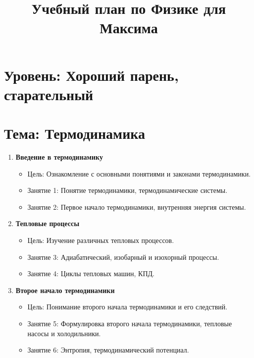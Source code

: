 \documentclass{article}
\begin{document}
\title{\textbf{Учебный план по Физике для Максима}}
\author{}
\date{}
\maketitle

\section*{Уровень: Хороший парень, старательный}

\section*{Тема: Термодинамика}

\begin{enumerate}[label=\textbf{\arabic*.}, leftmargin=*]
  \item \textbf{Введение в термодинамику}
    \begin{itemize}
        \item Цель: Ознакомление с основными понятиями и законами термодинамики.
        \item Занятие 1: Понятие термодинамики, термодинамические системы.
        \item Занятие 2: Первое начало термодинамики, внутренняя энергия системы.
    \end{itemize}
  
  \item \textbf{Тепловые процессы}
    \begin{itemize}
        \item Цель: Изучение различных тепловых процессов.
        \item Занятие 3: Адиабатический, изобарный и изохорный процессы.
        \item Занятие 4: Циклы тепловых машин, КПД.
    \end{itemize}
  
  \item \textbf{Второе начало термодинамики}
    \begin{itemize}
        \item Цель: Понимание второго начала термодинамики и его следствий.
        \item Занятие 5: Формулировка второго начала термодинамики, тепловые насосы и холодильники.
        \item Занятие 6: Энтропия, термодинамический потенциал.
    \end{itemize}
\end{enumerate}
\end{document}
